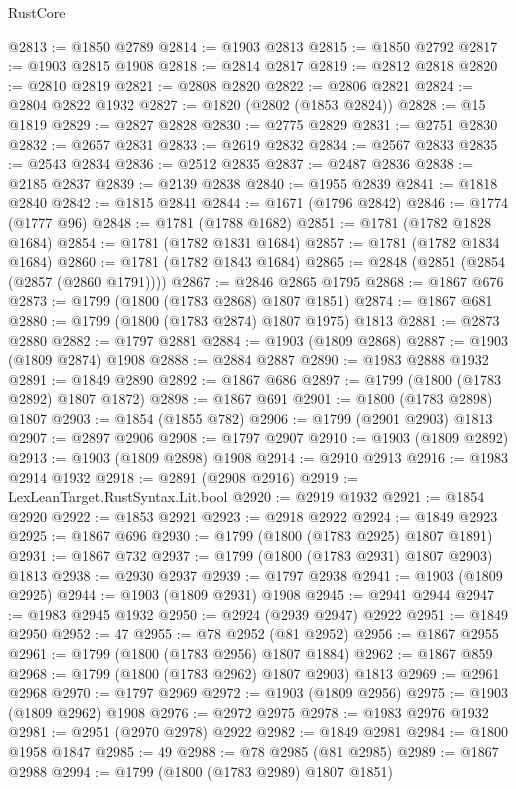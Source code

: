 \begin{lexlean}{RustCore}
\begin{coremodule}
@2813 := @1850 @2789
@2814 := @1903 @2813
@2815 := @1850 @2792
@2817 := @1903 @2815 @1908
@2818 := @2814 @2817
@2819 := @2812 @2818
@2820 := @2810 @2819
@2821 := @2808 @2820
@2822 := @2806 @2821
@2824 := @2804 @2822 @1932
@2827 := @1820 (@2802 (@1853 @2824))
@2828 := @15 @1819
@2829 := @2827 @2828
@2830 := @2775 @2829
@2831 := @2751 @2830
@2832 := @2657 @2831
@2833 := @2619 @2832
@2834 := @2567 @2833
@2835 := @2543 @2834
@2836 := @2512 @2835
@2837 := @2487 @2836
@2838 := @2185 @2837
@2839 := @2139 @2838
@2840 := @1955 @2839
@2841 := @1818 @2840
@2842 := @1815 @2841
@2844 := @1671 (@1796 @2842)
@2846 := @1774 (@1777 @96)
@2848 := @1781 (@1788 @1682)
@2851 := @1781 (@1782 @1828 @1684)
@2854 := @1781 (@1782 @1831 @1684)
@2857 := @1781 (@1782 @1834 @1684)
@2860 := @1781 (@1782 @1843 @1684)
@2865 := @2848 (@2851 (@2854 (@2857 (@2860 @1791))))
@2867 := @2846 @2865 @1795
@2868 := @1867 @676
@2873 := @1799 (@1800 (@1783 @2868) @1807 @1851)
@2874 := @1867 @681
@2880 := @1799 (@1800 (@1783 @2874) @1807 @1975) @1813
@2881 := @2873 @2880
@2882 := @1797 @2881
@2884 := @1903 (@1809 @2868)
@2887 := @1903 (@1809 @2874) @1908
@2888 := @2884 @2887
@2890 := @1983 @2888 @1932
@2891 := @1849 @2890
@2892 := @1867 @686
@2897 := @1799 (@1800 (@1783 @2892) @1807 @1872)
@2898 := @1867 @691
@2901 := @1800 (@1783 @2898) @1807
@2903 := @1854 (@1855 @782)
@2906 := @1799 (@2901 @2903) @1813
@2907 := @2897 @2906
@2908 := @1797 @2907
@2910 := @1903 (@1809 @2892)
@2913 := @1903 (@1809 @2898) @1908
@2914 := @2910 @2913
@2916 := @1983 @2914 @1932
@2918 := @2891 (@2908 @2916)
@2919 := LexLeanTarget.RustSyntax.Lit.bool
@2920 := @2919 @1932
@2921 := @1854 @2920
@2922 := @1853 @2921
@2923 := @2918 @2922
@2924 := @1849 @2923
@2925 := @1867 @696
@2930 := @1799 (@1800 (@1783 @2925) @1807 @1891)
@2931 := @1867 @732
@2937 := @1799 (@1800 (@1783 @2931) @1807 @2903) @1813
@2938 := @2930 @2937
@2939 := @1797 @2938
@2941 := @1903 (@1809 @2925)
@2944 := @1903 (@1809 @2931) @1908
@2945 := @2941 @2944
@2947 := @1983 @2945 @1932
@2950 := @2924 (@2939 @2947) @2922
@2951 := @1849 @2950
@2952 := 47
@2955 := @78 @2952 (@81 @2952)
@2956 := @1867 @2955
@2961 := @1799 (@1800 (@1783 @2956) @1807 @1884)
@2962 := @1867 @859
@2968 := @1799 (@1800 (@1783 @2962) @1807 @2903) @1813
@2969 := @2961 @2968
@2970 := @1797 @2969
@2972 := @1903 (@1809 @2956)
@2975 := @1903 (@1809 @2962) @1908
@2976 := @2972 @2975
@2978 := @1983 @2976 @1932
@2981 := @2951 (@2970 @2978) @2922
@2982 := @1849 @2981
@2984 := @1800 @1958 @1847
@2985 := 49
@2988 := @78 @2985 (@81 @2985)
@2989 := @1867 @2988
@2994 := @1799 (@1800 (@1783 @2989) @1807 @1851)

\end{coremodule}
\end{lexlean}
